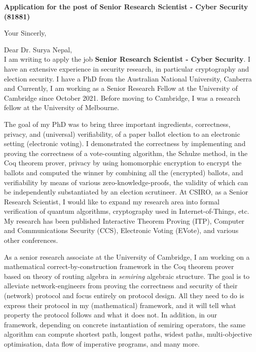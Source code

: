 \documentclass[11pt,a4paper,roman]{moderncv}
\begin{document}
\date{\today}
\opening{\textbf{Application for the post of Senior Research Scientist - Cyber Security (81881)}}
\closing{Your Sincerly, \vspace{-1em}}



\makelettertitle



Dear Dr. Surya Nepal, 
\\
\vspace{1em}
I am writing to apply
the job \textbf{Senior Research Scientist - Cyber Security}. 
I have an extensive experience in
security research, in particular cryptography and election security. 
I have a PhD from the Australian National University, Canberra
and Currently, I am working as a Senior Research Fellow at the University of 
Cambridge since October 2021. Before moving to Cambridge, I was a 
research fellow at the University of Melbourne. 

\vspace{0.5cm}
The goal of my PhD was to 
bring  three important ingredients, correctness, privacy, and (universal) verifiability, of a 
paper ballot election to an electronic setting (electronic voting). I 
demonstrated the correctness by implementing and proving the correctness of 
a vote-counting algorithm, the Schulze method, in the Coq theorem prover, 
privacy by using homomorphic encryption to encrypt the ballots and computed
the winner by combining all the (encrypted) ballots, and 
verifiability by means of various zero-knowledge-proofs, the validity of which can
be independently substantiated by an election scrutineer.
At CSIRO, as a Senior Research Scientist, 
I would like to expand my research area into formal verification 
of quantum algorithms, cryptography used in Internet-of-Things, etc. 
My research has been published Interactive Theorem Proving (ITP), 
Computer and Communications Security (CCS), Electronic Voting (EVote), 
and various other conferences. 

 

\vspace{0.5cm}
As a senior research associate at the University of Cambridge, 
I am working on  
a mathematical correct-by-construction framework in the Coq theorem prover 
based on theory of routing algebra in \emph{semiring} algebraic structure.
The goal is to alleviate network-engineers from proving the 
correctness and security of their (network) protocol and focus entirely on protocol design.
All  they need to do is express their protocol in my (mathematical) 
framework, and it will 
tell what property the protocol follows and what it does not. 
In addition, in our framework, depending on concrete instantiation 
of semiring operators, the same algorithm can compute shortest path, longest paths, 
widest paths, multi-objective optimisation, data flow of imperative programs, and many more. 
\end{document}

